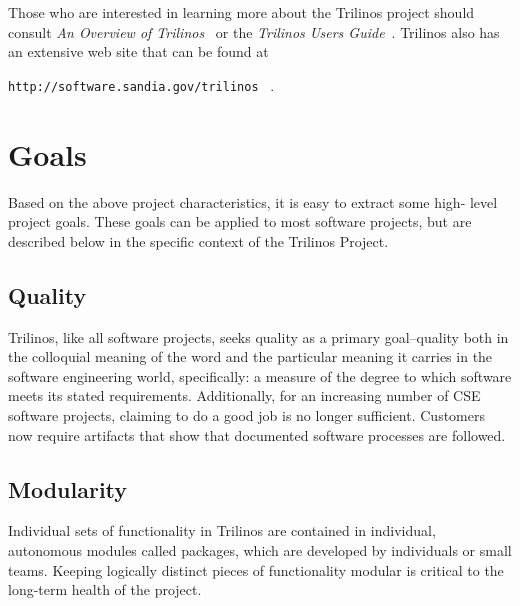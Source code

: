 \documentclass[12pt,relax]{article}
\newcommand{\InlineDirectory}[1]{
  {\hspace{0.01 in}} {\tt #1} {\hspace{0.01 in}}}
\begin{document}
Those who are interested in learning more about the Trilinos project should
consult {\it An Overview of Trilinos}~\cite{Trilinos-Overview} or the
{\it Trilinos Users Guide}~\cite{Trilinos-Users-Guide}.  Trilinos also has an
extensive web site that can be found at \newline
\InlineDirectory{http://software.sandia.gov/trilinos}~\cite{Trilinos-home-page}.





\section{Goals}
\label{Section:Goals}

Based on the above project characteristics, it is easy to extract some high-
level project goals.  These goals can be applied to most software projects,
but are described below in the specific context of the Trilinos Project.

\subsection{Quality}
Trilinos, like all software projects, seeks quality as a primary goal--quality
both in the colloquial meaning of the word and the particular meaning it
carries in the software engineering world, specifically:  a measure of the
degree to which software meets its stated requirements.  Additionally, for an 
increasing number of CSE software projects, claiming to do a good job is no 
longer sufficient.  Customers now require artifacts that show that documented 
software processes are followed.

\subsection{Modularity}
Individual sets of functionality in Trilinos are contained in individual,
autonomous modules called packages, which are developed by individuals or small
teams.  Keeping logically distinct pieces of functionality modular is critical
to the long-term health of the project.  
\end{document}
